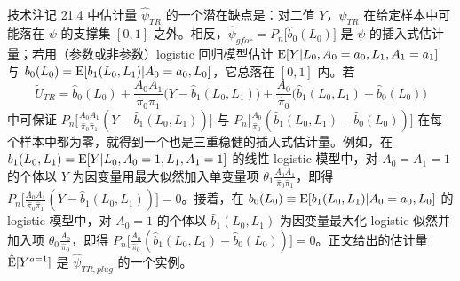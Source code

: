 \begin{techpoint}
技术注记 21.4 中估计量 $\hat\psi_{TR}$ 的一个潜在缺点是：对二值 $Y$，$\hat\psi_{TR}$ 在给定样本中可能落在 $\psi$ 的支撑集 $[0,1]$ 之外。相反，$\hat\psi_{gfor}=P_n\big[\hat b_0(L_0)\big]$ 是 $\psi$ 的插入式估计量；若用（参数或非参数）logistic 回归模型估计 $\mathrm{E}[Y|L_0,A_0=a_0,L_1,A_1=a_1]$ 与 $b_0(L_0)=\mathrm{E}[b_1(L_0,L_1)|A_0=a_0,L_0]$，它总落在 $[0,1]$ 内。若
\[
\tilde U_{TR}=\hat b_0(L_0)+\frac{A_0A_1}{\hat\pi_0\hat\pi_1}\big(Y-\hat b_1(L_0,L_1)\big)+\frac{A_0}{\hat\pi_0}\big(\hat b_1(L_0,L_1)-\hat b_0(L_0)\big)
\]
中可保证 $P_n\big[\frac{A_0A_1}{\hat\pi_0\hat\pi_1}(Y-\hat b_1(L_0,L_1))\big]$ 与 $P_n\big[\frac{A_0}{\hat\pi_0}(\hat b_1(L_0,L_1)-\hat b_0(L_0))\big]$ 在每个样本中都为零，就得到一个也是三重稳健的插入式估计量。例如，在 $b_1(L_0,L_1)=\mathrm{E}[Y|L_0,A_0=1,L_1,A_1=1]$ 的线性 logistic 模型中，对 $A_0=A_1=1$ 的个体以 $Y$ 为因变量用最大似然加入单变量项 $\theta_1\frac{A_0A_1}{\hat\pi_0\hat\pi_1}$，即得 $P_n\big[\frac{A_0A_1}{\hat\pi_0\hat\pi_1}(Y-\hat b_1(L_0,L_1))\big]=0$。接着，在 $b_0(L_0)\equiv\mathrm{E}[b_1(L_0,L_1)|A_0=a_0,L_0]$ 的 logistic 模型中，对 $A_0=1$ 的个体以 $\hat b_1(L_0,L_1)$ 为因变量最大化 logistic 似然并加入项 $\theta_0\frac{A_0}{\hat\pi_0}$，即得 $P_n\big[\frac{A_0}{\hat\pi_0}(\hat b_1(L_0,L_1)-\hat b_0(L_0))\big]=0$。正文给出的估计量 $\hat{\mathrm{E}}[Y^{a=1}]$ 是 $\hat\psi_{TR,plug}$ 的一个实例。
\end{techpoint}


